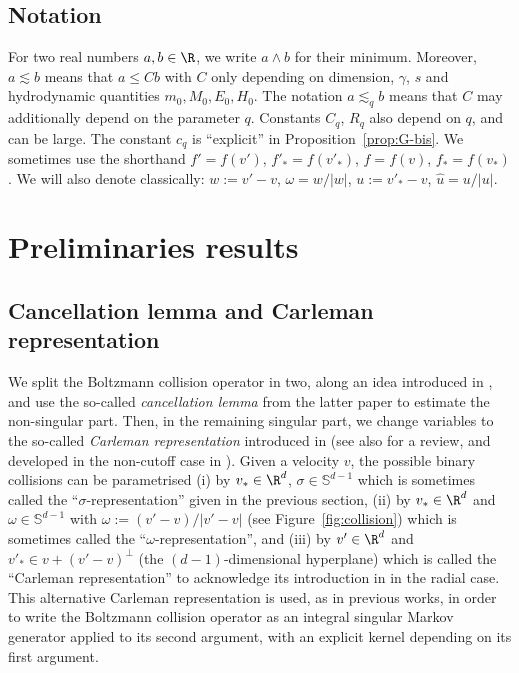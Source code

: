 \subsection{Notation} For two real numbers $a,b \in \R$, we write
$a \wedge b$ for their minimum. Moreover, $a \lesssim b$ means that
$ a \le C b$ with $C$ only depending on dimension, $\gamma$, $s$ and
hydrodynamic quantities $m_0, M_0, E_0, H_0$. The notation
$a \lesssim_q b$ means that $C$ may additionally depend on the
parameter $q$. Constants $C_q$, $R_q$ also depend on $q$, and can be
large. The constant $c_q$ is ``explicit'' in
Proposition~\ref{prop:G-bis}. We sometimes use the shorthand
$f'=f(v')$, $f'_*=f(v'_*)$, $f=f(v)$, $f_*=f(v_*)$. We will also
denote classically: $w:=v'-v$, $\omega = w/|w|$, $u:=v'_*-v$,
$\hat u = u/|u|$.

\section{Preliminaries results}
\label{s:prelim}

\subsection{Cancellation lemma and Carleman representation}

We split the Boltzmann collision operator in two, along an idea
introduced in \cite{advw}, and use the so-called \emph{cancellation
lemma} from the latter paper to estimate the non-singular
part. Then, in the remaining singular part, we change variables to the
so-called \emph{Carleman representation} introduced in
\cite{MR1555365,MR0098477} (see also
\cite[\S 4.6]{villani-book} for a review, and developed in the
non-cutoff case in \cite[\S 4]{luis}). Given a velocity $v$, the
possible binary collisions can be parametrised (i) by $v_* \in \R^d$,
$\sigma \in \mathbb S^{d-1}$ which is sometimes called the
``$\sigma$-representation'' given in the previous section, (ii) by
$v_* \in \R^d$ and $\omega \in \mathbb S^{d-1}$ with
$\omega := (v'-v)/|v'-v|$ (see Figure~\ref{fig:collision}) which is
sometimes called the ``$\omega$-representation'', and (iii) by
$v' \in \R^d$ and $v'_* \in v + (v'-v)^\bot$ (the $(d-1)$-dimensional
hyperplane) which is called the ``Carleman representation'' to
acknowledge its introduction in \cite{MR1555365} in the radial
case. This alternative Carleman representation is used, as in previous
works, in order to write the Boltzmann collision operator as an
integral singular Markov generator applied to its second argument,
with an explicit kernel depending on its first argument.


